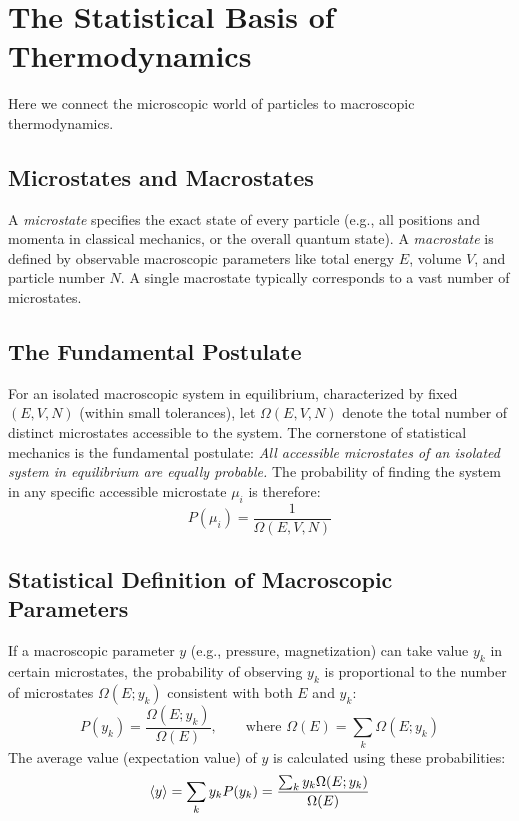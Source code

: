 \documentclass[10pt, letterpaper]{article}
\newcommand{\avg}[1]{\expval{#1}} %
\begin{document}
\section{The Statistical Basis of Thermodynamics}
Here we connect the microscopic world of particles to macroscopic thermodynamics.

\subsection{Microstates and Macrostates}
A \textit{microstate} specifies the exact state of every particle (e.g., all positions and momenta in classical mechanics, or the overall quantum state). A \textit{macrostate} is defined by observable macroscopic parameters like total energy $E$, volume $V$, and particle number $N$. A single macrostate typically corresponds to a vast number of microstates.

\subsection{The Fundamental Postulate}
For an isolated macroscopic system in equilibrium, characterized by fixed $(E, V, N)$ (within small tolerances), let $\Omega(E, V, N)$ denote the total number of distinct microstates accessible to the system. The cornerstone of statistical mechanics is the fundamental postulate:
\textit{All accessible microstates of an isolated system in equilibrium are equally probable.}
The probability of finding the system in any specific accessible microstate $\mu_i$ is therefore:
\begin{equation*}
    P(\mu_i) = \frac{1}{\Omega(E, V, N)}
\end{equation*}

\subsection{Statistical Definition of Macroscopic Parameters}
If a macroscopic parameter $y$ (e.g., pressure, magnetization) can take value $y_k$ in certain microstates, the probability of observing $y_k$ is proportional to the number of microstates $\Omega(E; y_k)$ consistent with both $E$ and $y_k$:
\begin{equation}
    P(y_k) = \frac{\Omega(E; y_k)}{\Omega(E)}, \qquad \text{where } \Omega(E) = \sum_k \Omega(E; y_k)
\end{equation}
The average value (expectation value) of $y$ is calculated using these probabilities:
\begin{equation}
    \avg{y} = \sum_k y_k P(y_k) = \frac{\sum_k y_k \Omega(E; y_k)}{\Omega(E)}
\end{equation}
\end{document}

